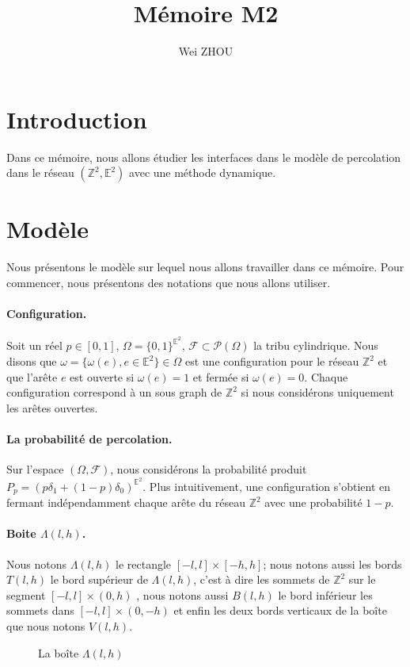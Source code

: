 \documentclass[titlepage,a4paper,12pt]{article}
\title{Mémoire M2}
\author{Wei ZHOU}
\newcounter{cor}
\begin{document}
\maketitle

\section{Introduction}
Dans ce mémoire, nous allons étudier les interfaces dans le modèle de percolation dans le réseau $(\mathbb{Z}^2,\mathbb{E}^2)$ avec une méthode dynamique.

\section{Modèle}
Nous présentons le modèle sur lequel nous allons travailler dans ce mémoire. Pour commencer, nous présentons des notations que nous allons utiliser.

\paragraph{Configuration.} Soit un réel $p\in [0,1]$, $\Omega = \{0,1\}^{\mathbb{E}^2}$, $\mathcal{F}\subset \mathcal{P}(\Omega)$ la tribu cylindrique. Nous disons que $\omega = \{\omega(e), e\in \mathbb{E}^2\} \in \Omega$ est une configuration pour le réseau $\mathbb{Z}^2$ et que l'arête $e$ est ouverte si $\omega(e) = 1$ et fermée si $\omega(e)= 0$. Chaque configuration correspond à un sous graph de $\mathbb{Z}^2$ si nous considérons uniquement les arêtes ouvertes.
\paragraph{La probabilité de percolation.} Sur l'espace $(\Omega, \mathcal{F})$, nous considérons la probabilité produit $P_p = (p\delta_1 +(1-p)\delta_0)^{\mathbb{E}^2}$. Plus intuitivement, une configuration s'obtient en fermant indépendamment chaque arête du réseau $\mathbb{Z}^2$ avec une probabilité $1-p$. 

\paragraph{Boite $\Lambda(l,h)$.}Nous notons $\Lambda(l,h)$ le rectangle $[-l,l]\times[-h,h]$;  nous notons aussi les bords $T(l,h)$ le bord supérieur de $\Lambda(l,h)$, c'est à dire les sommets de $\mathbb{Z}^2$ sur le segment $[-l,l]\times(0,h)$ , nous notons aussi $B(l,h)$ le bord inférieur les sommets dans $[-l,l]\times(0,-h)$ et enfin les deux bords verticaux de la boîte que nous notons $V(l,h)$.
\begin{figure}[h]
\center
{}
\caption{La boîte $\Lambda(l,h)$}
\end{figure}
\end{document}
